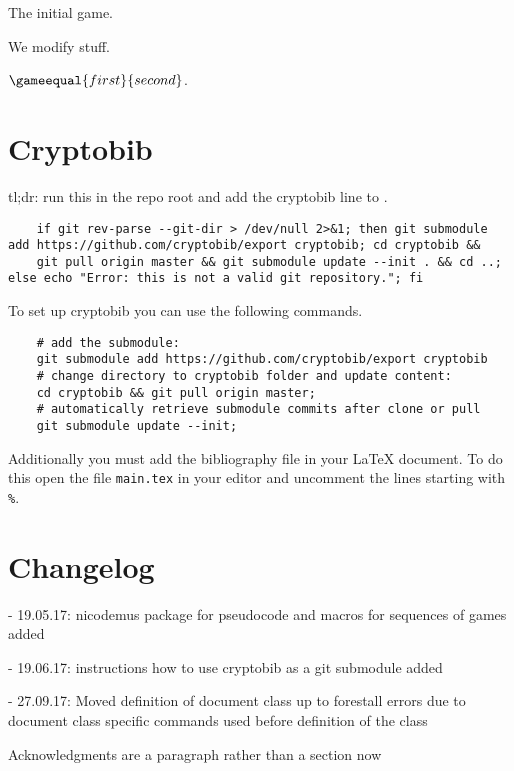  The initial game.

 We modify stuff.

\begin{claim}
$\gameequal{first}{second}$.
\end{claim}

\section{Cryptobib}
tl;dr: run this in the repo root and add the cryptobib line to \verb||.
\begin{tiny}
\begin{verbatim}
	if git rev-parse --git-dir > /dev/null 2>&1; then git submodule add https://github.com/cryptobib/export cryptobib; cd cryptobib &&
	git pull origin master && git submodule update --init . && cd ..; else echo "Error: this is not a valid git repository."; fi
\end{verbatim}
\end{tiny}

To set up cryptobib you can use the following commands.
\begin{verbatim}
	# add the submodule:
	git submodule add https://github.com/cryptobib/export cryptobib
	# change directory to cryptobib folder and update content:
	cd cryptobib && git pull origin master;
	# automatically retrieve submodule commits after clone or pull
	git submodule update --init;
\end{verbatim}

Additionally you must add the bibliography file in your \LaTeX{} document.
To do this open the file \verb|main.tex| in your editor and uncomment the lines starting with \verb|%|.

\section{Changelog}


- 19.05.17: nicodemus package for pseudocode and macros for sequences of games added

\noindent - 19.06.17: instructions how to use cryptobib as a git submodule added

\noindent - 27.09.17: Moved definition of document class up to forestall errors due to document class specific commands used before definition of the class

Acknowledgments are a paragraph rather than a section now

